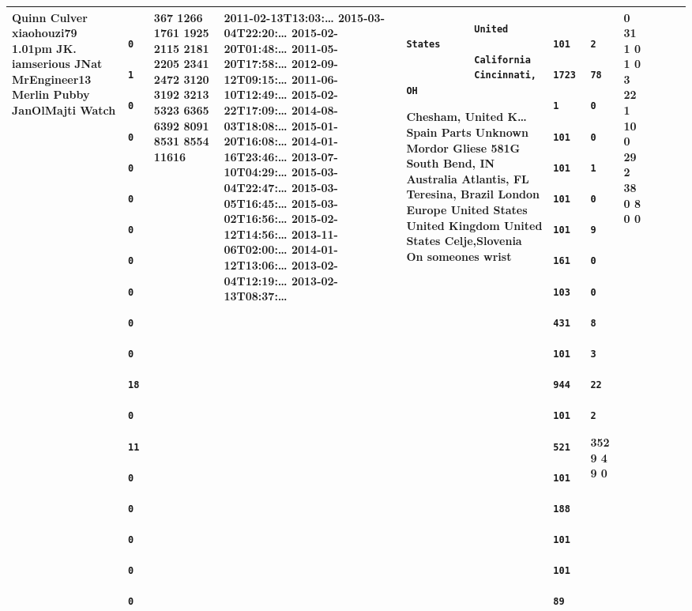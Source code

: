 \documentclass[12pt,a4paper,twoside,openright,titlepage,final]{article}
\begin{document}
\begin{enumerate}
\begin{longtable}[]{@{}lllllllllll@{}}
\begin{minipage}[t]{0.09\columnwidth}
			Quinn Culver xiaohouzi79 1.01pm JK. iamserious JNat MrEngineer13 Merlin
			Pubby JanOlMajti Watch
			\strut\end{minipage} &
		\begin{minipage}[t]{0.05\columnwidth}\raggedright\strut
			\begin{verbatim}
			0
			1
			0
			0
			0
			0
			0
			0
			0
			0
			0
			18
			0
			11
			0
			0
			0
			0
			0
			\end{verbatim}
			\strut\end{minipage} &
		\begin{minipage}[t]{0.03\columnwidth}\raggedright\strut
			367 1266 1761 1925 2115 2181 2205 2341 2472 3120 3192 3213 5323 6365
			6392 8091 8531 8554 11616
			\strut\end{minipage} &
		\begin{minipage}[t]{0.11\columnwidth}\raggedright\strut
			2011-02-13T13:03:\ldots{} 2015-03-04T22:20:\ldots{}
			2015-02-20T01:48:\ldots{} 2011-05-20T17:58:\ldots{}
			2012-09-12T09:15:\ldots{} 2011-06-10T12:49:\ldots{}
			2015-02-22T17:09:\ldots{} 2014-08-03T18:08:\ldots{}
			2015-01-20T16:08:\ldots{} 2014-01-16T23:46:\ldots{}
			2013-07-10T04:29:\ldots{} 2015-03-04T22:47:\ldots{}
			2015-03-05T16:45:\ldots{} 2015-03-02T16:56:\ldots{}
			2015-02-12T14:56:\ldots{} 2013-11-06T02:00:\ldots{}
			2014-01-12T13:06:\ldots{} 2013-02-04T12:19:\ldots{}
			2013-02-13T08:37:\ldots{}
			\strut\end{minipage} &
		\begin{minipage}[t]{0.11\columnwidth}\raggedright\strut
			\begin{verbatim}
			United States
			California
			Cincinnati, OH
			\end{verbatim}
			
			Chesham, United K\ldots{} Spain Parts Unknown Mordor Gliese 581G South
			Bend, IN Australia Atlantis, FL Teresina, Brazil London Europe United
			States United Kingdom United States Celje,Slovenia On someones wrist
			\strut\end{minipage} &
		\begin{minipage}[t]{0.06\columnwidth}\raggedright\strut
			\begin{verbatim}
			101
			1723
			1
			101
			101
			101
			101
			161
			103
			431
			101
			944
			101
			521
			101
			188
			101
			101
			89
			\end{verbatim}
			\strut\end{minipage} &
		\begin{minipage}[t]{0.04\columnwidth}\raggedright\strut
			\begin{verbatim}
			2
			78
			0
			0
			1
			0
			9
			0
			0
			8
			3
			22
			2
			\end{verbatim}
			
			352 9 4 9 0
			\strut\end{minipage} &
		\begin{minipage}[t]{0.04\columnwidth}\raggedright\strut
			0 31 1 0 1 0 3 22 1 10 0 29 2 38 0 8 0 0
			\strut\end{minipage}\tabularnewline
		\bottomrule
	\end{longtable}
	
\end{enumerate}
\end{document}
